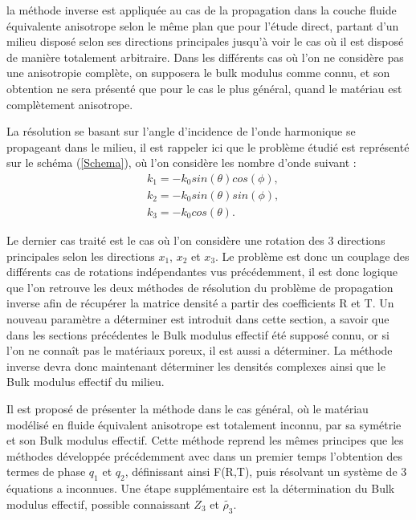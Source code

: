 \documentclass[12pt]{report}
\begin{document}
    la méthode inverse est appliquée au cas de la propagation dans la couche fluide équivalente anisotrope selon le même plan que pour l'étude direct, partant d'un milieu disposé selon ses directions principales jusqu'à voir le cas où il est disposé de manière totalement arbitraire. Dans les différents cas où l'on ne considère pas une anisotropie complète, on supposera le bulk modulus comme connu, et son obtention ne sera présenté que pour le cas le plus général, quand le matériau est complètement anisotrope.
    
    La résolution se basant sur l'angle d'incidence  de l'onde harmonique se propageant dans le milieu, il est rappeler ici que le problème étudié est représenté sur le schéma (\ref{Schema}), où l'on considère les nombre d'onde suivant :
    \begin{align*}
    &k_1=-k_0 sin(\theta) cos(\phi), \\
    &k_2=-k_0 sin(\theta) sin(\phi), \\
    &k_3= -k_0 cos(\theta).
    \end{align*} 
    



Le dernier cas traité est le cas où l'on considère une rotation des 3 directions principales selon les directions $x_1$, $x_2$ et $x_3$. Le problème est donc un couplage des différents cas de rotations indépendantes vus précédemment, il est donc logique que l'on retrouve les deux méthodes de résolution du problème de propagation inverse afin de récupérer la matrice densité a partir des coefficients R et T. Un nouveau paramètre a déterminer est introduit dans cette section, a savoir que dans les sections précédentes le Bulk modulus effectif été supposé connu, or si l'on ne connaît pas le matériaux poreux, il est aussi a déterminer. La méthode inverse devra donc maintenant déterminer les densités complexes ainsi que le Bulk modulus effectif du milieu.    
    
    Il est proposé de présenter la méthode dans le cas général, où le matériau modélisé en fluide équivalent anisotrope est totalement inconnu, par sa symétrie et son Bulk modulus effectif. Cette méthode reprend les mêmes principes que les méthodes développée précédemment avec dans un premier temps l'obtention des termes de phase $q_1$ et $q_2$, définissant ainsi F(R,T), puis résolvant un système de 3 équations a inconnues. Une étape supplémentaire est la détermination du Bulk modulus effectif, possible connaissant $Z_3$ et $\tilde{\rho_3}$.
    
\end{document}
